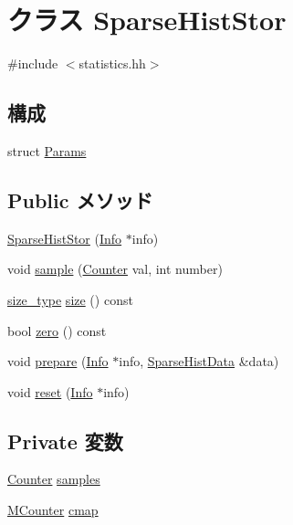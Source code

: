 \hypertarget{classStats_1_1SparseHistStor}{
\section{クラス SparseHistStor}
\label{classStats_1_1SparseHistStor}
}


{\ttfamily \#include $<$statistics.hh$>$}\subsection*{構成}
\begin{DoxyCompactItemize}
\item 
struct \hyperlink{structStats_1_1SparseHistStor_1_1Params}{Params}
\end{DoxyCompactItemize}
\subsection*{Public メソッド}
\begin{DoxyCompactItemize}
\item 
\hyperlink{classStats_1_1SparseHistStor_a967cbb09317bc988b824444b31e8d525}{SparseHistStor} (\hyperlink{classStats_1_1Info}{Info} $\ast$info)
\item 
void \hyperlink{classStats_1_1SparseHistStor_a57fea70de4ed8fee9ec9e9d9cca6f9fa}{sample} (\hyperlink{namespaceStats_ac35128c026c72bb36af9cea00774e8a6}{Counter} val, int number)
\item 
\hyperlink{namespaceStats_ada51e68d31936547d3729c82daf6b7c6}{size\_\-type} \hyperlink{classStats_1_1SparseHistStor_a503ab01f6c0142145d3434f6924714e7}{size} () const 
\item 
bool \hyperlink{classStats_1_1SparseHistStor_a4e72b01b727d3165e75cba84eb507491}{zero} () const 
\item 
void \hyperlink{classStats_1_1SparseHistStor_a8bbe5515dd8959f8461c7e887c258270}{prepare} (\hyperlink{classStats_1_1Info}{Info} $\ast$info, \hyperlink{structStats_1_1SparseHistData}{SparseHistData} \&data)
\item 
void \hyperlink{classStats_1_1SparseHistStor_a10d9d71be6e0d2194999bb5dd5280e2d}{reset} (\hyperlink{classStats_1_1Info}{Info} $\ast$info)
\end{DoxyCompactItemize}
\subsection*{Private 変数}
\begin{DoxyCompactItemize}
\item 
\hyperlink{namespaceStats_ac35128c026c72bb36af9cea00774e8a6}{Counter} \hyperlink{classStats_1_1SparseHistStor_ab4db99aba3dd28686061dd3d5475b3bd}{samples}
\item 
\hyperlink{namespaceStats_a5a8433a643d3c7f0692fd273dcbe6423}{MCounter} \hyperlink{classStats_1_1SparseHistStor_afc3dc68e80fbd8901da278bff71674e4}{cmap}
\end{DoxyCompactItemize}


